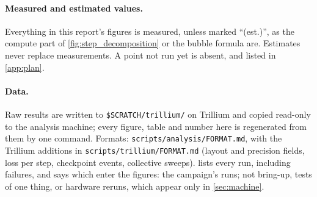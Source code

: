\paragraph{Measured and estimated values.} Everything in this report's figures is measured, unless marked ``(est.)'', as the compute part of \cref{fig:step_decomposition} or the bubble formula are. Estimates never replace measurements. A point not run yet is absent, and listed in \cref{app:plan}.

\paragraph{Data.} Raw results are written to \texttt{\$SCRATCH/trillium/} on Trillium and copied
read-only to the analysis machine; every figure, table and number here is regenerated from them by one
command. Formats: \texttt{scripts/analysis/FORMAT.md}, with the Trillium additions in
\texttt{scripts/trillium/FORMAT.md} (layout and precision fields, loss per step, checkpoint events,
collective sweeps).  lists every run, including failures, and says which enter the figures: the campaign's runs; not bring-up, tests of one thing, or hardware reruns, which appear only in \cref{sec:machine}.
